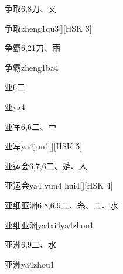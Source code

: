 \begin{Entry}{争取}{6,8}{⼑、⼜}
  \begin{Phonetics}{争取}{zheng1qu3}[][HSK 3]
  \end{Phonetics}
\end{Entry}

\begin{Entry}{争霸}{6,21}{⼑、⾬}
  \begin{Phonetics}{争霸}{zheng1ba4}
  \end{Phonetics}
\end{Entry}

\begin{Entry}{亚}{6}{⼆}
  \begin{Phonetics}{亚}{ya4}
  \end{Phonetics}
\end{Entry}

\begin{Entry}{亚军}{6,6}{⼆、⼍}
  \begin{Phonetics}{亚军}{ya4jun1}[][HSK 5]
  \end{Phonetics}
\end{Entry}

\begin{Entry}{亚运会}{6,7,6}{⼆、⾡、⼈}
  \begin{Phonetics}{亚运会}{ya4 yun4 hui4}[][HSK 4]
  \end{Phonetics}
\end{Entry}

\begin{Entry}{亚细亚洲}{6,8,6,9}{⼆、⽷、⼆、⽔}
  \begin{Phonetics}{亚细亚洲}{ya4xi4ya4zhou1}
  \end{Phonetics}
\end{Entry}

\begin{Entry}{亚洲}{6,9}{⼆、⽔}
  \begin{Phonetics}{亚洲}{ya4zhou1}
  \end{Phonetics}
\end{Entry}

